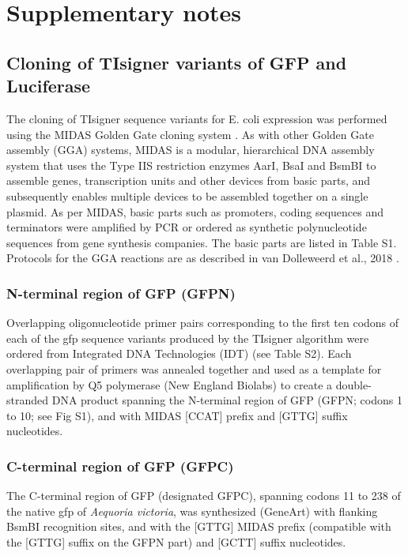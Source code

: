 \section{Supplementary notes}

\subsection{Cloning of TIsigner variants of GFP and Luciferase}
The cloning of TIsigner sequence variants for E. coli expression was performed using the MIDAS Golden Gate cloning system \cite{Van_Dolleweerd2018-pw}. As with other Golden Gate assembly (GGA) systems, MIDAS is a modular, hierarchical DNA assembly system that uses the Type IIS restriction enzymes AarI, BsaI and BsmBI to assemble genes, transcription units and other devices from basic parts, and subsequently enables multiple devices to be assembled together on a single plasmid.
As per MIDAS, basic parts such as promoters, coding sequences and terminators were amplified by PCR or ordered as synthetic polynucleotide sequences from gene synthesis companies. The basic parts are listed in Table S1. Protocols for the GGA reactions are as described in van Dolleweerd et al., 2018 \cite{Van_Dolleweerd2018-pw}.

\subsubsection{N-terminal region of GFP (GFPN)}
Overlapping oligonucleotide primer pairs corresponding to the first ten codons of each of the gfp sequence variants produced by the TIsigner algorithm were ordered from Integrated DNA Technologies (IDT) (see Table S2). Each overlapping pair of primers was annealed together and used as a template for amplification by Q5 polymerase (New England Biolabs) to create a double-stranded DNA product spanning the N-terminal region of GFP (GFPN; codons 1 to 10; see Fig S1), and with MIDAS [CCAT] prefix and [GTTG] suffix nucleotides.

\subsubsection{C-terminal region of GFP (GFPC)}
The C-terminal region of GFP (designated GFPC), spanning codons 11 to 238 of the native gfp of \textit{Aequoria victoria}, was synthesized (GeneArt) with flanking BsmBI recognition sites, and with the [GTTG] MIDAS prefix (compatible with the [GTTG] suffix on the GFPN part) and [GCTT] suffix nucleotides.

